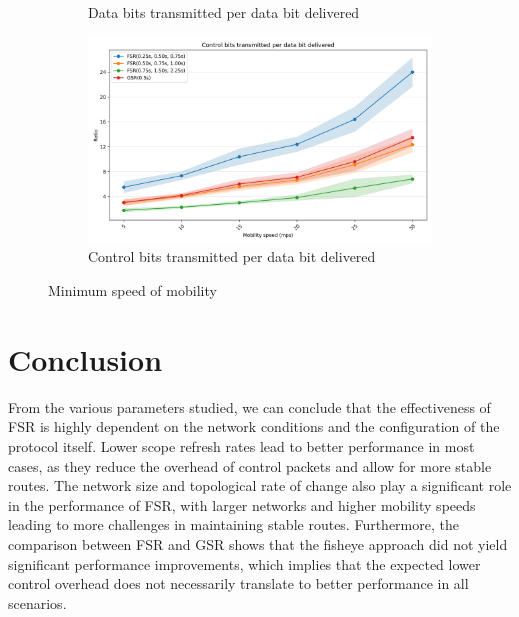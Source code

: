 \documentclass{winslabreport}
\begin{document}
\begin{figure}
\begin{subfigure}[b]{0.45\textwidth}
        \caption{Data bits transmitted per data bit delivered}
        \label{fig:data_bits_speed}
    \end{subfigure}
    \begin{subfigure}[b]{0.45\textwidth}
        \includegraphics[width=\textwidth]{../figures/speed/control_bits_transmitted_per_data_bit_delivered.png}
        \caption{Control bits transmitted per data bit delivered}
        \label{fig:control_bits_speed}
    \end{subfigure}
    \caption{Minimum speed of mobility}
    \label{fig:speed}
\end{figure}

\section{Conclusion}
From the various parameters studied, we can conclude that the effectiveness of FSR is highly dependent on the network conditions and the configuration of the protocol itself. Lower scope refresh rates lead to better performance in most cases, as they reduce the overhead of control packets and allow for more stable routes. The network size and topological rate of change also play a significant role in the performance of FSR, with larger networks and higher mobility speeds leading to more challenges in maintaining stable routes. Furthermore, the comparison between FSR and GSR shows that the fisheye approach did not yield significant performance improvements, which implies that the expected lower control overhead does not necessarily translate to better performance in all scenarios.

\printbibliography[title={References}]

\appendix
\end{document}
